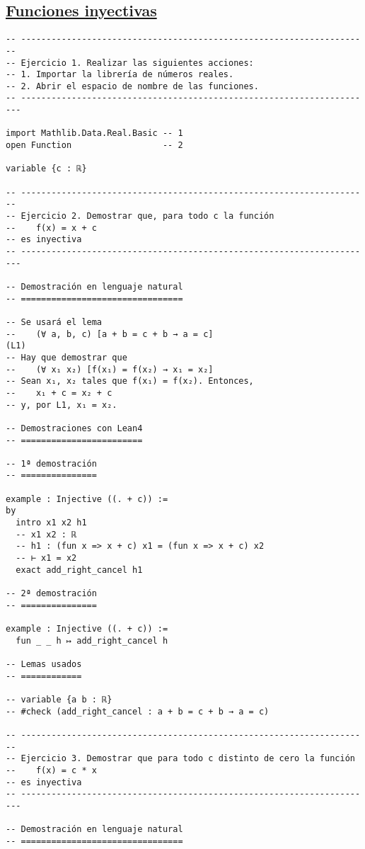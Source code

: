 \subsection{\href{./src/Logica/Funciones\_inyectivas.lean}{Funciones inyectivas}}
\label{sec:orgc37be0e}
\begin{verbatim}
-- ---------------------------------------------------------------------
-- Ejercicio 1. Realizar las siguientes acciones:
-- 1. Importar la librería de números reales.
-- 2. Abrir el espacio de nombre de las funciones.
-- ----------------------------------------------------------------------

import Mathlib.Data.Real.Basic -- 1
open Function                  -- 2

variable {c : ℝ}

-- ---------------------------------------------------------------------
-- Ejercicio 2. Demostrar que, para todo c la función
--    f(x) = x + c
-- es inyectiva
-- ----------------------------------------------------------------------

-- Demostración en lenguaje natural
-- ================================

-- Se usará el lema
--    (∀ a, b, c) [a + b = c + b → a = c]                            (L1)
-- Hay que demostrar que
--    (∀ x₁ x₂) [f(x₁) = f(x₂) → x₁ = x₂]
-- Sean x₁, x₂ tales que f(x₁) = f(x₂). Entonces,
--    x₁ + c = x₂ + c
-- y, por L1, x₁ = x₂.

-- Demostraciones con Lean4
-- ========================

-- 1ª demostración
-- ===============

example : Injective ((. + c)) :=
by
  intro x1 x2 h1
  -- x1 x2 : ℝ
  -- h1 : (fun x => x + c) x1 = (fun x => x + c) x2
  -- ⊢ x1 = x2
  exact add_right_cancel h1

-- 2ª demostración
-- ===============

example : Injective ((. + c)) :=
  fun _ _ h ↦ add_right_cancel h

-- Lemas usados
-- ============

-- variable {a b : ℝ}
-- #check (add_right_cancel : a + b = c + b → a = c)

-- ---------------------------------------------------------------------
-- Ejercicio 3. Demostrar que para todo c distinto de cero la función
--    f(x) = c * x
-- es inyectiva
-- ----------------------------------------------------------------------

-- Demostración en lenguaje natural
-- ================================


\end{verbatim}
